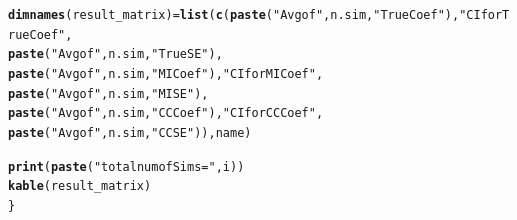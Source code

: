 \documentclass[fleqn,10pt]{wlscirep}\usepackage[]{graphicx}\usepackage[]{color}
\makeatletter
\newcommand{\hlstr}[1]{\textcolor[rgb]{0.192,0.494,0.8}{#1}}%
\newcommand{\hlstd}[1]{\textcolor[rgb]{0.345,0.345,0.345}{#1}}%
\newcommand{\hlkwb}[1]{\textcolor[rgb]{0.69,0.353,0.396}{#1}}%
\newcommand{\hlkwd}[1]{\textcolor[rgb]{0.737,0.353,0.396}{\textbf{#1}}}%
\newenvironment{kframe}{%
 \def\at@end@of@kframe{}%
 \ifinner\ifhmode%
  \def\at@end@of@kframe{\end{minipage}}%
  \begin{minipage}{\columnwidth}%
 \fi\fi%
 \def\FrameCommand##1{\hskip\@totalleftmargin \hskip-\fboxsep
 \colorbox{shadecolor}{##1}\hskip-\fboxsep
     \hskip-\linewidth \hskip-\@totalleftmargin \hskip\columnwidth}%
 \MakeFramed {\advance\hsize-\width
   \@totalleftmargin\z@ \linewidth\hsize
   \@setminipage}}%
 {\par\unskip\endMakeFramed%
 \at@end@of@kframe}
\newenvironment{knitrout}{}{} %
\makeatother
\begin{document}
\begin{knitrout}
\begin{kframe}
\begin{alltt}
  \hlkwd{dimnames}\hlstd{(result_matrix)} \hlkwb{=} \hlkwd{list}\hlstd{(}\hlkwd{c}\hlstd{(}\hlkwd{paste}\hlstd{(}\hlstr{"Avg of"}\hlstd{, n.sim,} \hlstr{"True Coef"}\hlstd{),} \hlstr{"CI for True Coef"}\hlstd{,}
                                   \hlkwd{paste}\hlstd{(}\hlstr{"Avg of"}\hlstd{, n.sim,} \hlstr{"True SE"}\hlstd{),}
                                   \hlkwd{paste}\hlstd{(}\hlstr{"Avg of"}\hlstd{, n.sim,} \hlstr{"MI Coef"}\hlstd{),} \hlstr{"CI for MI Coef"}\hlstd{,}
                                   \hlkwd{paste}\hlstd{(}\hlstr{"Avg of"}\hlstd{, n.sim,} \hlstr{"MI SE"}\hlstd{),}
                                   \hlkwd{paste}\hlstd{(}\hlstr{"Avg of"}\hlstd{, n.sim,} \hlstr{"CC Coef"}\hlstd{),} \hlstr{"CI for CC Coef"}\hlstd{,}
                                   \hlkwd{paste}\hlstd{(}\hlstr{"Avg of"}\hlstd{, n.sim,} \hlstr{"CC SE"}\hlstd{)), name)}

  \hlkwd{print}\hlstd{(}\hlkwd{paste}\hlstd{(}\hlstr{"total num of Sims = "}\hlstd{, i))}
  \hlkwd{kable}\hlstd{(result_matrix)}
\hlstd{\}}
\end{alltt}
\end{kframe}
\end{knitrout}
\end{document}
